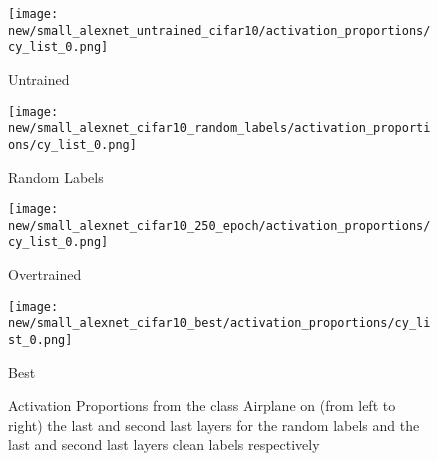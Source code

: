 \documentclass{article}
\begin{document}
            \begin{figure}[H]
                \centering
                \begin{minipage}{0.45\textwidth}
                    \centering
                    \texttt{[image: new/small\_alexnet\_untrained\_cifar10/activation\_proportions/cy\_list\_0.png]}
                    \caption{Untrained}
                \end{minipage}
                \hfill
                \begin{minipage}{0.45\textwidth}
                    \centering
                    \texttt{[image: new/small\_alexnet\_cifar10\_random\_labels/activation\_proportions/cy\_list\_0.png]}
                    \caption{Random Labels}
                \end{minipage}
                \begin{minipage}{0.45\textwidth}
                    \centering
                    \texttt{[image: new/small\_alexnet\_cifar10\_250\_epoch/activation\_proportions/cy\_list\_0.png]}
                    \caption{Overtrained}
                \end{minipage}
                \hfill
                \begin{minipage}{0.45\textwidth}
                    \centering
                    \texttt{[image: new/small\_alexnet\_cifar10\_best/activation\_proportions/cy\_list\_0.png]}
                    \caption{Best}
                \end{minipage}
                \hfill
                
                \caption{Activation Proportions from the class Airplane on (from left to right) the last and second last layers for the random labels and the last and second last layers clean labels respectively}
                \label{fig:class_airplane}
            \end{figure}
            
\end{document}
